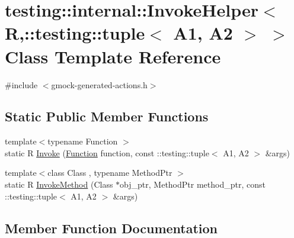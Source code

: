 \hypertarget{classtesting_1_1internal_1_1InvokeHelper_3_01R_00_1_1testing_1_1tuple_3_01A1_00_01A2_01_4_01_4}{}\section{testing\+:\+:internal\+:\+:Invoke\+Helper$<$ R,\+:\+:testing\+:\+:tuple$<$ A1, A2 $>$ $>$ Class Template Reference}
\label{classtesting_1_1internal_1_1InvokeHelper_3_01R_00_1_1testing_1_1tuple_3_01A1_00_01A2_01_4_01_4}


{\ttfamily \#include $<$gmock-\/generated-\/actions.\+h$>$}

\subsection*{Static Public Member Functions}
\begin{DoxyCompactItemize}
\item 
{\footnotesize template$<$typename Function $>$ }\\static R \hyperlink{classtesting_1_1internal_1_1InvokeHelper_3_01R_00_1_1testing_1_1tuple_3_01A1_00_01A2_01_4_01_4_abb388db2d26daff9eebca8aa643ab978}{Invoke} (\hyperlink{structtesting_1_1internal_1_1Function}{Function} function, const \+::testing\+::tuple$<$ A1, A2 $>$ \&args)
\item 
{\footnotesize template$<$class Class , typename Method\+Ptr $>$ }\\static R \hyperlink{classtesting_1_1internal_1_1InvokeHelper_3_01R_00_1_1testing_1_1tuple_3_01A1_00_01A2_01_4_01_4_ab8b7fd635406845405c71711655df4c7}{Invoke\+Method} (Class $\ast$obj\+\_\+ptr, Method\+Ptr method\+\_\+ptr, const \+::testing\+::tuple$<$ A1, A2 $>$ \&args)
\end{DoxyCompactItemize}


\subsection{Member Function Documentation}
